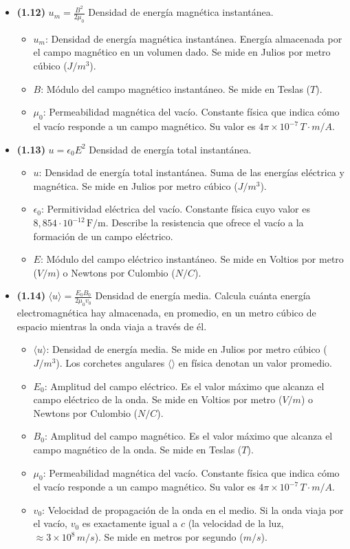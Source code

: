 \documentclass{article}
\begin{document}
\begin{itemize}
				\item \textbf{(1.12)} $\boxed{u_{m}=\frac{B^{2}}{2\mu_{0}}}$ Densidad de energía magnética instantánea.
					\begin{itemize}
						\item $u_m$: Densidad de energía magnética instantánea. Energía almacenada por el campo magnético en un volumen dado. Se mide en Julios por metro cúbico ($J/m^3$).
						\item $B$: Módulo del campo magnético instantáneo. Se mide en Teslas ($T$).
						\item $\mu_0$: Permeabilidad magnética del vacío. Constante física que indica cómo el vacío responde a un campo magnético. Su valor es $4\pi \times 10^{-7} \, T\cdot m/A$.
					\end{itemize}

				\item \textbf{(1.13)} $\boxed{u=\epsilon_{0}E^{2}}$ Densidad de energía total instantánea.
					\begin{itemize}
						\item $u$: Densidad de energía total instantánea. Suma de las energías eléctrica y magnética. Se mide en Julios por metro cúbico ($J/m^3$).
						\item $\epsilon_{0}$: Permitividad eléctrica del vacío. Constante física cuyo valor es $8,854\cdot10^{-12}\,\text{F/m}$. Describe la resistencia que ofrece el vacío a la formación de un campo eléctrico.
						\item $E$: Módulo del campo eléctrico instantáneo. Se mide en Voltios por metro ($V/m$) o Newtons por Culombio ($N/C$).
					\end{itemize}

				\item \textbf{(1.14)} $\boxed{\langle u\rangle=\frac{E_{0}B_{0}}{2\mu_{0}v_{0}}}$ Densidad de energía media. Calcula cuánta energía electromagnética hay almacenada, en promedio, en un metro cúbico de espacio mientras la onda viaja a través de él.
					\begin{itemize}
						\item $\langle u\rangle$: Densidad de energía media. Se mide en Julios por metro cúbico ($J/m^3$). Los corchetes angulares $\langle \rangle$ en física denotan un valor promedio.
						\item $E_0$: Amplitud del campo eléctrico. Es el valor máximo que alcanza el campo eléctrico de la onda. Se mide en Voltios por metro ($V/m$) o Newtons por Culombio ($N/C$).
						\item $B_0$: Amplitud del campo magnético. Es el valor máximo que alcanza el campo magnético de la onda. Se mide en Teslas ($T$).
						\item $\mu_0$: Permeabilidad magnética del vacío. Constante física que indica cómo el vacío responde a un campo magnético. Su valor es $4\pi \times 10^{-7} \, T\cdot m/A$.
						\item $v_0$: Velocidad de propagación de la onda en el medio. Si la onda viaja por el vacío, $v_0$ es exactamente igual a $c$ (la velocidad de la luz, $\approx 3 \times 10^8 \, m/s$). Se mide en metros por segundo ($m/s$).
					\end{itemize}


\end{itemize}
\end{document}
